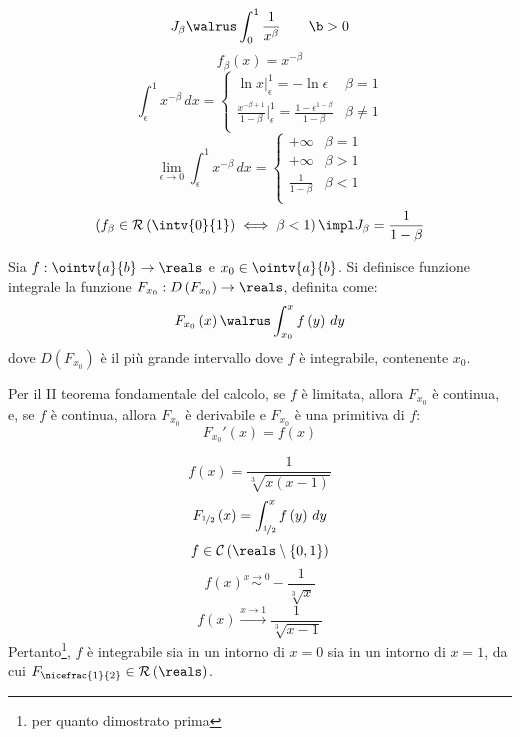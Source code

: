 \begin{example}
  $$J_\beta\walrus\int_0^1\frac{1}{x^\beta}\qquad\b>0$$
  $$f_\beta\left( x \right)=x^{-\beta}$$
  $$
    \int_\epsilon^1x^{-\beta}\,dx=
    \begin{cases}
      \ln x\Big|_\epsilon^1=-\ln\epsilon                                                & \beta=1    \\
      \frac{x^{-\beta+1}}{1-\beta}\Big|_\epsilon^1=\frac{1-\epsilon^{1-\beta}}{1-\beta} & \beta\neq1 \\
    \end{cases}
  $$
  $$
    \lim_{\epsilon\to0}\int_\epsilon^1x^{-\beta}\,dx=
    \begin{cases}
      +\infty           & \beta=1 \\
      +\infty           & \beta>1 \\
      \frac{1}{1-\beta} & \beta<1 \\
    \end{cases}
  $$
  $$\left( f_\beta\in\mathcal{R}\left( \intv{0}{1} \right)\iff \beta<1 \right) \impl J_\beta=\frac{1}{1-\beta}$$
\end{example}

\begin{definition}
  Sia $f:\ointv{a}{b}\to\reals$ e $x_0\in\ointv{a}{b}$. Si definisce funzione integrale la funzione $F_{x_0}:D\left( F_{x_0} \right)\to\reals$, definita come:
  $$F_{x_0}\left( x \right)\walrus \int_{x_0}^xf\left( y \right)\,dy$$
  dove $D\left( F_{x_0} \right)$ è il più grande intervallo dove $f$ è integrabile, contenente $x_0$.
\end{definition}

\begin{observation}
  Per il II teorema fondamentale del calcolo, se $f$ è limitata, allora $F_{x_0}$ è continua, e, se $f$ è continua, allora $F_{x_0}$ è derivabile e $F_{x_0}$ è una primitiva di $f$:
  $$F_{x_0}'\left( x \right)=f\left( x \right)$$
\end{observation}

\begin{example}
  $$f\left( x \right)=\frac{1}{\sqrt[3]{x\left( x-1 \right)}}$$
  $$F_{\nicefrac{1}{2}}\left( x \right)=\int_{\nicefrac{1}{2}}^xf\left( y \right)\,dy$$
  $$f\in\mathcal{C}\left( \reals\setminus\left\{ 0,1 \right\} \right)$$
  $$f\left( x \right)\stackrel{x\to0}{\sim}-\frac{1}{\sqrt[3]{x}}$$
  $$f\left( x \right)\xrightarrow{x\to1}\frac{1}{\sqrt[3]{x-1}}$$
  Pertanto\footnote{per quanto dimostrato prima}, $f$ è integrabile sia in un intorno di $x=0$ sia in un intorno di $x=1$, da cui $F_{\nicefrac{1}{2}}\in\mathcal{R}\left( \reals \right)$.
\end{example}

